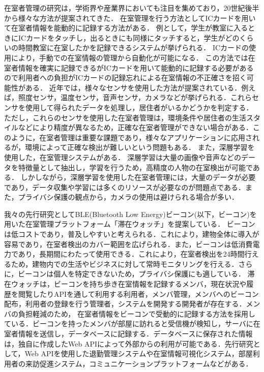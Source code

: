 在室者管理の研究は，学術界や産業界においても注目を集めており，20世紀後半から様々な方法が提案されてきた．
在室管理を行う方法としてICカードを用いて在室者情報を能動的に記録する方法がある．
例として，学生が教室に入るときにICカードをタッチし，出るときにも同様にタッチすると，学生がどのくらいの時間教室に在室したかを記録できるシステムが挙げられる． ICカードの使用により，手動での在室情報の管理から自動化が可能になる．
この方法では在室者情報を確実に記録できるがICカードを用いて能動的に記録する必要があるので利用者への負担がICカードの記録忘れによる在室情報の不正確さを招く可能性がある．
近年では，様々なセンサを使用した方法が提案されている．例えば，照度センサ，温度センサ，音声センサ，カメラなどが挙げられる．これらセンサを使用して得られたデータを処理し，居住者がいるかどうかを判定する．
ただし，これらのセンサを使用した在室者管理は，環境条件や居住者の生活スタイルなどにより精度が異なるため，正確な在室者管理ができない場合がある．このように，在室者管理は重要な課題であり，様々なアプリケーションに応用されるが，環境によって正確な検出が難しいという問題もある．
また，深層学習を使用した，在室管理システムがある．
深層学習は大量の画像や音声などのデータを特徴量として抽出し，学習を行うため，高精度の人物の在室検出が可能である．
しかしながら，深層学習を使用した在室者管理には，大量のデータが必要であり，データ収集や学習には多くのリソースが必要なのが問題点である．また，プライバシ保護の観点から，カメラの使用は避けられる場合が多い．

我々の先行研究としてBLE(Bluetooth Low Energy)ビーコン(以下，ビーコン)を用いた在室管理プラットフォーム「滞在ウォッチ」を提案している．
ビーコンは低コストであり，普及しやすいと考えられる．これにより，建物全体に導入が容易であり，在室者検出のカバー範囲を広げられる．また，ビーコンは低消費電力であり，長期間にわたって使用できる．これにより，在室者検出を24時間行えるため，建物内での生活やビジネスに対して常時モニタリングを行える．さらに，ビーコンは個人を特定できないため，プライバシ保護にも適している．
滞在ウォッチは，ビーコンを持ち歩き在室情報を記録するメンバ，現在状況や履歴を閲覧したりAPIを通して利用する利用者，メンバ管理，メンバへのビーコン配布，利用者の登録を行う管理者，システムを開発する開発者が存在する．メンバの負担軽減のため，
在室者情報をビーコンで受動的に記録する方法を採用している．ビーコンを持ったメンバが部屋に訪れると受信機が検知し，サーバに在室者情報を送信し，データベースに記録する．データベースに保存された情報は，独自に作成したWeb APIによって外部からの利用が可能である．先行研究として，Web APIを使用した退勤管理システムや在室情報可視化システム，部屋利用者の来訪促進システム，コミュニケーションプラットフォームなどがある．


